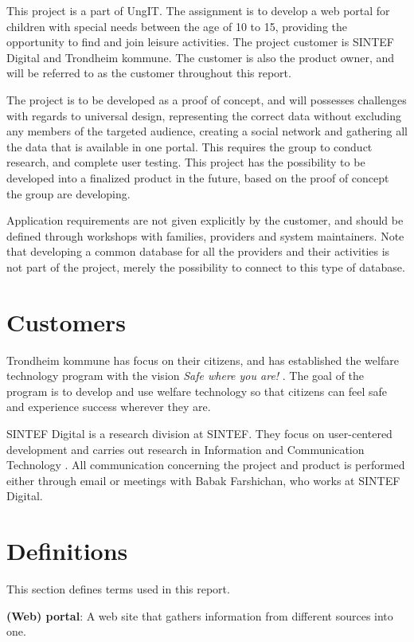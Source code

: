 This project is a part of UngIT. The assignment is to develop a web portal for children with special needs between the age of 10 to 15, providing the opportunity to find and join leisure activities. The project customer is SINTEF Digital and Trondheim kommune.
The customer is also the product owner, and will be referred to as the customer throughout this report.

The project is to be developed as a proof of concept, and will possesses challenges with regards to universal design, representing the correct data without excluding any members of the targeted audience, creating a social network and gathering all the data that is available in one portal. This requires the group to conduct research, and complete user testing. This project has the possibility to be developed into a finalized product in the future, based on the proof of concept the group are developing.

Application requirements are not given explicitly by the customer, and should be defined through workshops with families, providers and system maintainers. Note that developing a common database for all the providers and their activities is not part of the project, merely the possibility to connect to this type of database. 

\section{Customers}
Trondheim kommune has focus on their citizens, and has established the welfare technology program with the vision \textit{Safe where you are!} \cite{WelfareProgram}. The goal of the program is to develop and use welfare technology so that citizens can feel safe and experience success wherever they are.

SINTEF Digital is a research division at SINTEF. They focus on user-centered development and carries out research in Information and Communication Technology \cite{SintefDigital}. All communication concerning the project and product is performed either through email or meetings with Babak Farshichan, who works at SINTEF Digital.


\section{Definitions}
This section defines terms used in this report. 

\textbf{(Web) portal}: A web site that gathers information from different sources into one. 

